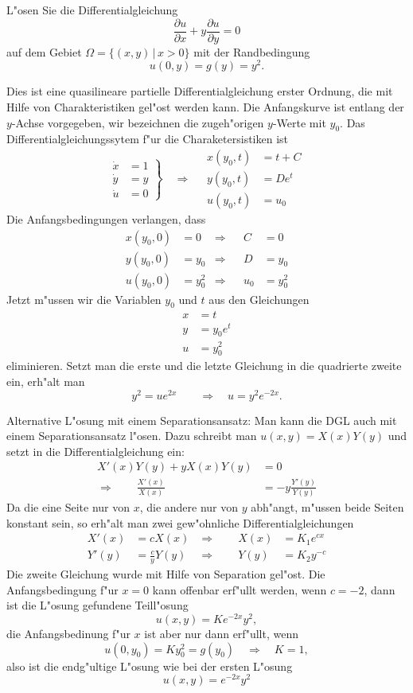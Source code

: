 L"osen Sie die Differentialgleichung
\[
\frac{\partial u}{\partial x}+y\frac{\partial u}{\partial y}=0
\]
auf dem Gebiet $\Omega=\{(x,y)\,|\, x> 0\}$ mit der Randbedingung
\[
u(0,y)=g(y)=y^2.
\]

\begin{loesung}
Dies ist eine quasilineare partielle Differentialgleichung
erster Ordnung, die mit Hilfe von Charakteristiken gel"ost werden
kann.
Die Anfangskurve ist entlang der $y$-Achse vorgegeben, wir bezeichnen
die zugeh"origen $y$-Werte mit $y_0$.
Das Differentialgleichungssytem f"ur die  Charaketersistiken ist
\[
\left.
\begin{aligned}
\dot x&=1\\
\dot y&=y\\
\dot u&=0
\end{aligned}
\right\}\quad\Rightarrow\quad
\begin{aligned}
x(y_0,t)&=t+C\\
y(y_0,t)&=De^t\\
u(y_0,t)&=u_0
\end{aligned}
\]
Die Anfangsbedingungen verlangen, dass
\begin{align*}
x(y_0,0)&=0&\Rightarrow&&C&=0\\
y(y_0,0)&=y_0&\Rightarrow&&D&=y_0\\
u(y_0,0)&=y_0^2&\Rightarrow&&u_0&=y_0^2
\end{align*}
Jetzt m"ussen wir die Variablen $y_0$ und $t$ aus den Gleichungen
\begin{align*}
x&=t\\
y&=y_0e^t\\
u&=y_0^2
\end{align*}
eliminieren. Setzt man die erste und die letzte Gleichung in die
quadrierte zweite ein, erh"alt man
\[
y^2=ue^{2x}\qquad\Rightarrow\quad u=y^2e^{-2x}.
\]

Alternative L"osung mit einem Separationsansatz: Man kann die DGL auch
mit einem Separationsansatz l"osen. Dazu schreibt man $u(x,y)=X(x)Y(y)$
und setzt in die Differentialgleichung ein:
\begin{align*}
X'(x)Y(y)+yX(x)Y(y)&=0\\
\Rightarrow\qquad \frac{X'(x)}{X(x)}&=-y\frac{Y'(y)}{Y(y)}
\end{align*}
Da die eine Seite nur von $x$, die andere nur von $y$ abh"angt, m"ussen
beide Seiten konstant sein, so erh"alt man zwei gew"ohnliche
Differentialgleichungen
\begin{align*}
X'(x)&=cX(x)&\Rightarrow\qquad X(x)&=K_1e^{cx}\\
Y'(y)&=\frac{c}{y}Y(y)&\Rightarrow\qquad Y(y)&=K_2y^{-c}
\end{align*}
Die zweite Gleichung wurde mit Hilfe von Separation gel"ost.
Die Anfangsbedingung f"ur $x=0$ kann offenbar erf"ullt werden,
wenn $c=-2$, dann ist die L"osung gefundene Teill"osung
\[
u(x,y)=Ke^{-2x}y^2,
\]
die Anfangsbedinung f"ur $x$ ist aber nur dann erf"ullt, wenn
\[
u(0,y_0)=Ky_0^2=g(y_0)\quad\Rightarrow\quad K=1,
\]
also ist die endg"ultige L"osung wie bei der ersten L"osung
\[
u(x,y)=e^{-2x}y^2
\]
\end{loesung}
